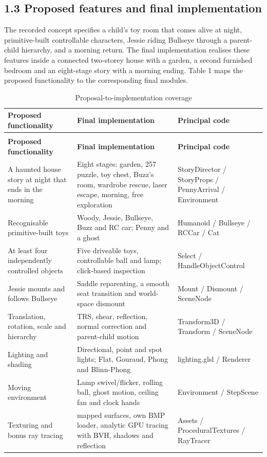 \documentclass[12pt,a4paper]{article}
\begin{document}
\subsection*{1.3 Proposed features and final implementation}
The recorded concept specifies a child's toy room that comes alive at night, primitive-built controllable characters, Jessie riding Bullseye through a parent-child hierarchy, and a morning return. The final implementation realises these features inside a connected two-storey house with a garden, a second furnished bedroom and an eight-stage story with a morning ending. Table 1 maps the proposed functionality to the corresponding final modules.

{\small\setlength{\tabcolsep}{4pt}\renewcommand{\arraystretch}{1.12}
\begin{longtable}{>{\raggedright\arraybackslash}p{}>{\raggedright\arraybackslash}p{}>{\raggedright\arraybackslash}p{}}
\caption{Proposal-to-implementation coverage}\label{tab:1}\\
\toprule
\textbf{Proposed functionality} & \textbf{Final implementation} & \textbf{Principal code} \\\midrule
\endfirsthead
\multicolumn{3}{l}{\small\itshape Table \thetable{} (continued)}\\
\toprule
\textbf{Proposed functionality} & \textbf{Final implementation} & \textbf{Principal code} \\\midrule
\endhead
\bottomrule\endfoot
A haunted house story at night that ends in the morning & Eight stages: garden, 257 puzzle, toy chest, Buzz's room, wardrobe rescue, laser escape, morning, free exploration & StoryDirector / StoryProps / PennyArrival / Environment \\
Recognisable primitive-built toys & Woody, Jessie, Bullseye, Buzz and RC car; Penny and a ghost & Humanoid / Bullseye / RCCar / Cat \\
At least four independently controlled objects & Five driveable toys, controllable ball and lamp; click-based inspection & Select / HandleObjectControl \\
Jessie mounts and follows Bullseye & Saddle reparenting, a smooth seat transition and world-space dismount & Mount / Dismount / SceneNode \\
Translation, rotation, scale and hierarchy & TRS, shear, reflection, normal correction and parent-child motion & Transform3D / Transform / SceneNode \\
Lighting and shading & Directional, point and spot lights; Flat, Gouraud, Phong and Blinn-Phong & lighting.glsl / Renderer \\
Moving environment & Lamp swivel/flicker, rolling ball, ghost motion, ceiling fan and clock hands & Environment / StepScene \\
Texturing and bonus ray tracing & 27 mapped surfaces, own BMP loader, analytic GPU tracing with BVH, shadows and reflection & Assets / ProceduralTextures / RayTracer \\
\end{longtable}
}
\end{document}
